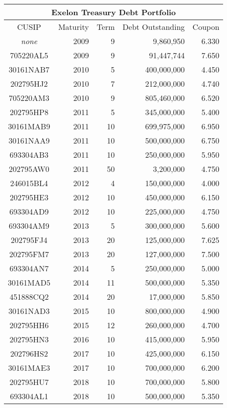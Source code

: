 \begin{table}[htbp]
	\centering
	\begin{tabular}{crrrr}
	\toprule
	\multicolumn{5}{c}{Exelon Treasury Debt Portfolio} \\
	\hline
CUSIP & Maturity & Term & Debt Outstanding & Coupon \\
\hline
\textit{none} & 2009 &	9 &	9,860,950 & 6.330 \\
705220AL5 &	2009 &	9 &	91,447,744	& 7.650 \\
30161NAB7 &	2010 &	5 &	400,000,000	& 4.450 \\
202795HJ2 &	2010 &	7 &	212,000,000	& 4.740 \\
705220AM3 &	2010 &	9 &	805,460,000	& 6.520 \\
202795HP8 &	2011 &	5 &	345,000,000	& 5.400 \\
30161MAB9 &	2011 &	10 &	699,975,000	& 6.950 \\
30161NAA9 &	2011 &	10 &	500,000,000	& 6.750 \\
693304AB3 &	2011 &	10 &	250,000,000	& 5.950 \\
202795AW0 &	2011 &	50 &	3,200,000	& 4.750 \\
246015BL4 &	2012 &	4 &	150,000,000	& 4.000 \\
202795HE3 &	2012 &	10 &	450,000,000	& 6.150 \\
693304AD9 &	2012 &	10 &	225,000,000	& 4.750 \\
693304AM9 &	2013 &	5 &	300,000,000	& 5.600 \\
202795FJ4 &	2013 &	20 &	125,000,000	& 7.625 \\
202795FM7 &	2013 &	20 &	127,000,000	& 7.500 \\
\hline
693304AN7 &	2014 &	5 &	250,000,000	& 5.000 \\
30161MAD5 &	2014 &	11 &	500,000,000	& 5.350 \\
451888CQ2 &	2014 &	20 &	17,000,000	& 5.850 \\
30161NAD3 &	2015 &	10 &	800,000,000	& 4.900 \\
202795HH6 &	2015 &	12 &	260,000,000	& 4.700 \\
202795HN3 &	2016 &	10 &	415,000,000	& 5.950 \\
202796HS2 &	2017 &	10 &	425,000,000	& 6.150 \\
30161MAE3 &	2017 &	10 &	700,000,000	& 6.200 \\
202795HU7 &	2018 &	10 &	700,000,000	& 5.800 \\
693304AL1 &	2018 &	10 &	500,000,000	& 5.350 \\

\end{tabular}
\end{table}
